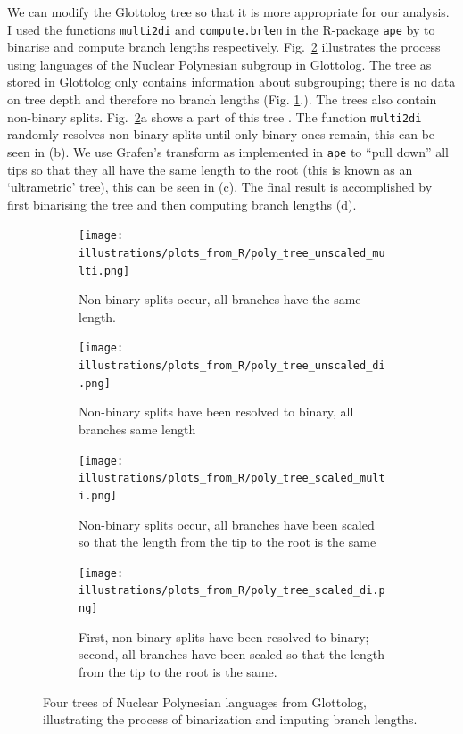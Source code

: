 \documentclass[draft,10pt]{article} %
\begin{document}
We can modify the Glottolog tree so that it is more appropriate for our analysis. I used the functions \texttt{multi2di} and \texttt{compute.brlen} in the R-package \texttt{ape} by \citet{paradis2004ape} to binarise and compute branch lengths respectively. Fig.~\ref{fig:branch_lengths} illustrates the process using languages of the Nuclear Polynesian subgroup in Glottolog. The tree as stored in Glottolog only contains information about subgrouping; there is no data on tree depth and therefore no branch lengths (Fig. \ref{glottolog_example_poly}.). The trees also contain non-binary splits. Fig.~\ref{fig:branch_lengths}a shows a part of this tree . The function \texttt{multi2di} randomly resolves non-binary splits until only binary ones remain, this can be seen in (b). We use Grafen's transform \citep{grafen1989phylogenetic} as implemented in \texttt{ape} to ``pull down'' all tips so that they all have the same length to the root (this is known as an `ultrametric' tree), this can be seen in (c). The final result is accomplished by first binarising the tree and then computing branch lengths (d). 

    \begin{figure}[!ht]
\centering
    \begin{subfigure}{0.45\linewidth}
      \texttt{[image: illustrations/plots\_from\_R/poly\_tree\_unscaled\_multi.png]}
    \caption{Non-binary splits occur, all branches have the same length.}
    \label{glottolog_example_poly}
    \end{subfigure}
\hfil
    \begin{subfigure}{0.45\linewidth}
          \texttt{[image: illustrations/plots\_from\_R/poly\_tree\_unscaled\_di.png]}
     \caption{Non-binary splits have been resolved to binary, all branches same length}
    \end{subfigure}

    \begin{subfigure}{0.45\linewidth}
     \texttt{[image: illustrations/plots\_from\_R/poly\_tree\_scaled\_multi.png]}
    \caption{Non-binary splits occur, all branches have been scaled so that the length from the tip to the root is the same}
    \end{subfigure}
\hfil
    \begin{subfigure}{0.45\linewidth}
      \texttt{[image: illustrations/plots\_from\_R/poly\_tree\_scaled\_di.png]}
    \caption{First, non-binary splits have been resolved to binary; second, all branches have been scaled so that the length from the tip to the root is the same.}
    \end{subfigure}

\caption[Four trees of Nuclear Polynesian demonstrating binarisation and imputing branch lengths.]{Four trees of Nuclear Polynesian languages from Glottolog, illustrating the process of binarization and imputing branch lengths.}
    \label{fig:branch_lengths}
    \end{figure}
    
\end{document}
